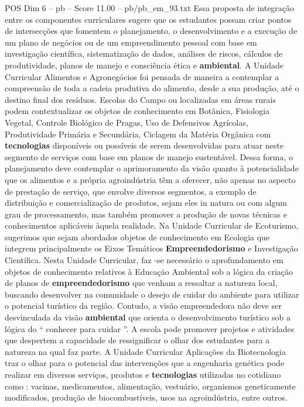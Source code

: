 \begin{textsample}{POS Dim 6 – pb – Score 11.00 – pb/pb\_em\_93.txt}
Essa proposta de integração entre os componentes curriculares sugere que os estudantes possam criar pontos de intersecções que fomentem o planejamento, o desenvolvimento e a execução de um plano de negócios ou de um empreendimento pessoal com base em investigação científica, sistematização de dados, análises de riscos, cálculos de produtividade, planos de manejo e consciência ética e \textbf{ambiental}.
A Unidade Curricular Alimentos e Agronegócios foi pensada de maneira a contemplar a compreensão de toda a cadeia produtiva do alimento, desde a sua produção, até o destino final dos resíduos.
Escolas do Campo ou localizadas em áreas rurais podem contextualizar os objetos de conhecimento em Botânica, Fisiologia Vegetal, Controle Biológico de Pragas, Uso de Defensivos Agrícolas, Produtividade Primária e Secundária, Ciclagem da Matéria Orgânica com \textbf{tecnologias} disponíveis ou possíveis de serem desenvolvidas para atuar neste segmento de serviços com base em planos de manejo sustentável.
Dessa forma, o planejamento deve contemplar o aprimoramento da visão quanto à potencialidade que os alimentos e a própria agroindústria têm a oferecer, não apenas no aspecto de prestação de serviço, que envolve diversos segmentos, a exemplo de distribuição e comercialização de produtos, sejam eles in natura ou com algum grau de processamento, mas também promover a produção de novas técnicas e conhecimentos aplicáveis àquela realidade.
Na Unidade Curricular de Ecoturismo, sugerimos que sejam abordados objetos de conhecimento em Ecologia que integrem principalmente os Eixos Temáticos \textbf{Empreendedorismo} e Investigação Científica.
Nesta Unidade Curricular, faz -se necessário o aprofundamento em objetos de conhecimento relativos à Educação Ambiental sob a lógica da criação de planos de \textbf{empreendedorismo} que venham a ressaltar a natureza local, buscando desenvolver na comunidade o desejo de cuidar do ambiente para utilizar o potencial turístico da região.
Contudo, a visão empreendedora não deve ser desvinculada da visão \textbf{ambiental} que orienta o desenvolvimento turístico sob a lógica do “ conhecer para cuidar ”.
A escola pode promover projetos e atividades que despertem a capacidade de ressignificar o olhar dos estudantes para a natureza na qual faz parte.
A Unidade Curricular Aplicações da Biotecnologia traz o olhar para o potencial das intervenções que a engenharia genética pode realizar em diversos serviços, produtos e \textbf{tecnologias} utilizadas no cotidiano como : vacinas, medicamentos, alimentação, vestuário, organismos geneticamente modificados, produção de biocombustíveis, usos na agroindústria, entre outros.

\end{textsample}
